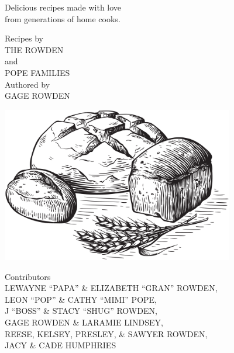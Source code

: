 \documentclass{cookbook}
\begin{document}
\clearpage

\pagestyle{empty}

\begin{center}

    \bfseries
    \nbvspace[1]
    \Huge
    {}

    \nbvspace[1]

    \normalsize{
        Delicious recipes made with love\\
        from generations of home cooks.\\
    }
    
    \nbvspace[2]

    \small Recipes by\\
    \Large\uppercase{The Rowden}\\
    \medskip\normalsize and\\
    \Large\uppercase{Pope Families}\\
    \medskip\footnotesize Authored by\\GAGE ROWDEN

    \nbvspace[3]

    \includegraphics[width=4in]{images/bread.png}
    \nbvspace[2]
    \normalsize

    Contributors\\
    \nbvspace[2]
    \small
    \uppercase{
        Lewayne ``Papa'' \& Elizabeth ``Gran'' Rowden,\\
        Leon ``Pop'' \& Cathy ``Mimi'' Pope,\\
        J ``Boss'' \& Stacy ``Shug'' Rowden,\\
        Gage Rowden \& Laramie Lindsey,\\
        Reese, Kelsey, Presley, \& Sawyer Rowden,\\
        Jacy \& Cade Humphries
    }

    \nbvspace[1]
\end{center}
\end{document}
